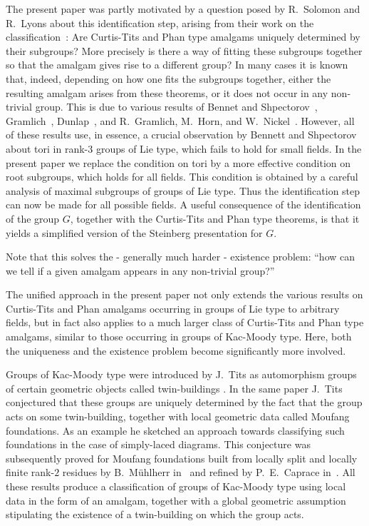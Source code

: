 \documentclass[12pt]{amsart}
\theoremstyle{definition}
\begin{document}
The present paper was partly motivated by a question posed by R.~Solomon and R.~Lyons about this identification step, arising from their work on the classification~\cite{Gor1983,GorLyoSol1996,GorLyoSol1998,GorLyoSol1999,GorLyoSol2002,GorLyoSol2005}: 
Are Curtis-Tits and Phan type amalgams uniquely determined by their subgroups? More precisely is there a way of fitting these subgroups together so that the amalgam gives rise to a different group? 
In many cases it is known that, indeed, depending on how one fits the subgroups together, either the resulting amalgam arises from these theorems, or it does not occur in any non-trivial group.
This is due to various results of Bennet and Shpectorov~\cite{BeSh2004}, Gramlich~\cite{Gr2004}, Dunlap~\cite{Dun2005}, and R.~Gramlich, M.~Horn, and W.~Nickel~\cite{GrHoNi2006}.
However, all of these results use, in essence, a crucial observation by Bennett and Shpectorov about tori in rank-$3$ groups of Lie type, which fails to hold for small fields.
In the present paper we replace the condition on tori by a more effective condition on root subgroups, which holds for all fields. This condition is obtained by a careful analysis of maximal subgroups of groups of Lie type.
Thus the identification step can now be made for all possible fields.
A useful consequence of the identification of the group $G$, together with the Curtis-Tits and Phan type theorems, is that it yields a simplified version of the Steinberg presentation for $G$.

Note that this solves the  - generally much harder - existence problem: ``how can we tell if a given amalgam appears in any non-trivial group?''



\medskip
The unified approach in the present paper not only extends the various results on Curtis-Tits and Phan amalgams occurring in groups of Lie type to arbitrary fields, but in fact also applies to a much larger class of Curtis-Tits and Phan type amalgams, similar to those occurring in groups of Kac-Moody type. Here, both the uniqueness and the existence problem become significantly more involved.

Groups of Kac-Moody type were introduced by J.~Tits as automorphism groups of certain geometric objects called twin-buildings \cite{Ti1992}. In the same paper J.~Tits conjectured that these groups are uniquely determined by the fact that the group acts on some twin-building, together with local geometric data called Moufang foundations. As an example he sketched an approach towards classifying such foundations in the case of simply-laced diagrams.
This conjecture was subsequently proved for Moufang foundations built from locally split and locally finite rank-$2$ residues by B.~M\"uhlherr in~\cite{Mu1999} and refined by P.~E.~Caprace in~\cite{Cap2007}.
All these results produce a classification of groups of Kac-Moody type using local data in the form of an amalgam, together with a global geometric assumption stipulating the existence of a twin-building on which the group acts.
\end{document}
